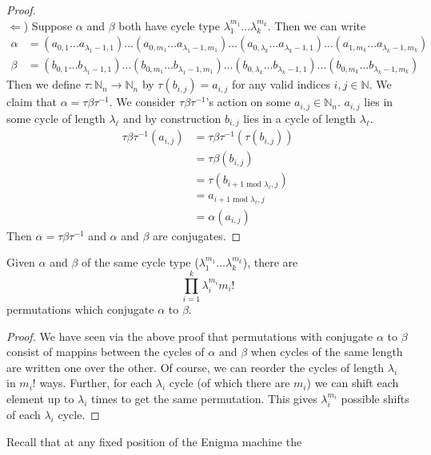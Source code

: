 \begin{proof}
\text{}\\$\Leftarrow$) Suppose $\alpha$ and $\beta$ both have cycle
type $\lambda_1^{m_1}\dots\lambda_k^{m_k}$. Then we can write
\begin{align*}
\alpha & = (a_{0,1}\dots a_{\lambda_1-1, 1})\dots(a_{0,m_1}\dots
a_{\lambda_1-1,m_1})\dots(a_{0,\lambda_k}\dots
a_{\lambda_k-1,1})\dots(a_{1,m_k}\dots a_{\lambda_k-1,m_k})      \\
\beta  & = (b_{0,1}\dots b_{\lambda_1-1,1})\dots(b_{0,m_1}\dots
b_{\lambda_1-1,m_1})\dots(b_{0,\lambda_k}\dots
b_{\lambda_k-1,1})\dots(b_{0,m_k}\dots b_{\lambda_k-1,m_k})
\end{align*}
Then we define $\tau:\mathbb{N}_n\to\mathbb{N}_n$ by $\tau(b_{i, j})
= a_{i,j}$ for any valid indices $i,j\in\mathbb{N}$.
We claim that $\alpha = \tau\beta\tau^{-1}$. We consider
$\tau\beta\tau^{-1}$'s action on some $a_{i,j}\in\mathbb{N}_n$.
$a_{i,j}$ lies in some cycle of length $\lambda_\ell$ and by
construction $b_{i,j}$ lies in a cycle of length $\lambda_\ell$.
\begin{align*}
\tau\beta\tau^{-1}(a_{i,j}) & = \tau\beta\tau^{-1}(\tau(b_{i,j}))        \\
& = \tau\beta(b_{i,j})                       \\
& = \tau(b_{i+1\text{ mod }\lambda_\ell, j}) \\
& = a_{i+1\text{ mod }\lambda_\ell, j}       \\
& = \alpha(a_{i,j})
\end{align*}
Then $\alpha = \tau\beta\tau^{-1}$ and $\alpha$ and $\beta$ are conjugates.
\end{proof}
\begin{corr}
Given $\alpha$ and $\beta$ of the same cycle type
($\lambda_1^{m_1}\dots\lambda_k^{m_k}$), there are
\[
\prod_{i=1}^{k}\lambda_i^{m_i}m_i!
\]
permutations which conjugate $\alpha$ to $\beta$.
\end{corr}
\begin{proof}
We have seen via the above proof that permutations with conjugate
$\alpha$ to $\beta$ consist of mappins between the cycles of $\alpha$
and $\beta$ when cycles of the same length are written one over the
other. Of course, we can reorder the cycles of length $\lambda_i$ in
$m_i!$ ways. Further, for each $\lambda_i$ cycle (of which there are
$m_i$) we can shift each element up to $\lambda_i$ times to get the
same permutation. This gives $\lambda_i^{m_i}$ possible shifts of
each $\lambda_i$ cycle.
\end{proof}
Recall that at any fixed position of the Enigma machine the
